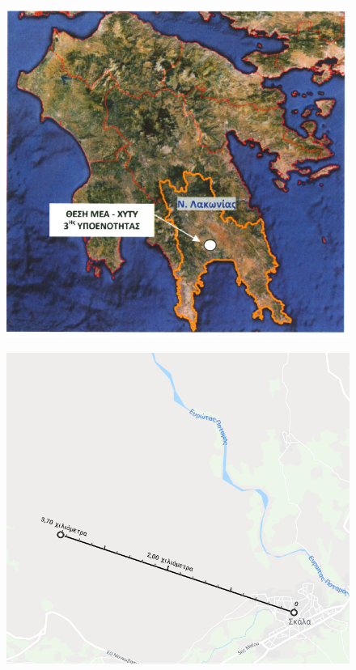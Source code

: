 \documentclass[12pt]{article}
\begin{document}
	\begin{figure} [H]
		\begin{center}
			\includegraphics [scale = 0.40] {map5.png}
		\end{center}
	\end{figure}

	\begin{figure} [H]
		\begin{center}
			\includegraphics [scale = 0.40] {map6.png}
		\end{center}
	\end{figure}
\end{document}
